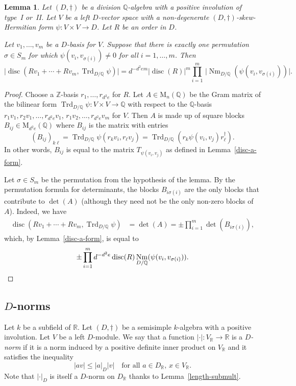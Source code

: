 \documentclass[JEP,XML,SOM,Unicode,NoFloatCountersInSection]{cedram}
\newcommand{\bQ}{\mathbb{Q}}
\newcommand{\bR}{\mathbb{R}}
\newcommand{\bZ}{\mathbb{Z}}
\newcommand{\rM}{\mathrm{M}}
\DeclareMathOperator{\disc}{disc}
\DeclareMathOperator{\Nm}{Nm}
\DeclareMathOperator{\Trd}{Trd}
\newcommand{\abs}[1]{\lvert #1 \rvert}
\newcommand{\defterm}[1]{\emph{#1}}
\newtheorem{lemma}{Lemma}[section]
\begin{document}
\begin{lemma} \label{disc-triangular}
Let $(D, \dag)$ be a division $\bQ$-algebra with a positive involution of type~I or~II.
Let $V$ be a left $D$-vector space with a non-degenerate $(D,\dag)$-skew-Hermitian form $\psi \colon V \times V \to D$.
Let $R$ be an order in $D$.

Let $v_1, \dotsc, v_m$ be a $D$-basis for $V$.
Suppose that there is exactly one permutation $\sigma \in S_m$ for which $\psi(v_i, v_{\sigma(i)}) \neq 0$ for all $i = 1, \dotsc, m$.
Then
\[
\abs{\disc(Rv_1 + \dotsb + Rv_m, \Trd_{D/\bQ} \psi)} = d^{-d^2em} \abs{\disc(R)}^m \prod_{i=1}^m\, \abs{\Nm_{D/\bQ}(\psi(v_i, v_{\sigma(i)}))}.
\]
\end{lemma}

\begin{proof}
Choose a $\bZ$-basis $r_1, \dotsc, r_{d^2e}$ for $R$.
Let $A \in \rM_n(\bQ)$ be the Gram matrix of the bilinear form $\Trd_{D/\bQ} \psi \colon V \times V \to \bQ$ with respect to the $\bQ$-basis $r_1 v_1, r_2 v_1, \dotsc, r_{d^2e} v_1$, $r_1 v_2, \dotsc, r_{d^2e} v_m$ for $V$.
Then $A$ is made up of square blocks $B_{ij} \in \rM_{d^2e}(\bQ)$ where $B_{ij}$ is the matrix with entries
\[
(B_{ij})_{k\ell} = \Trd_{D/\bQ} \psi(r_k v_i, r_\ell v_j) = \Trd_{D/\bQ}(r_k\psi(v_i, v_j)r_\ell^\dag).
\]
In other words, $B_{ij}$ is equal to the matrix $T_{\psi(v_i, v_j)}$ as defined in Lemma~\ref{disc-a-form}.

Let $\sigma \in S_m$ be the permutation from the hypothesis of the lemma.
By the permutation formula for determinants, the blocks $B_{i\sigma(i)}$ are the only blocks that
contribute to $\det(A)$ (although they need not be the only non-zero blocks of~$A$).
Indeed, we have
\begin{align*}
\disc(Rv_1 + \dotsb + Rv_m, \Trd_{D/\bQ} \psi)
& = \det(A)
= \pm \prod_{i=1}^m \det(B_{i\sigma(i)}),
\end{align*}
which, by Lemma~\ref{disc-a-form}, is equal to
\[
\pm \prod_{i=1}^m d^{-d^2e} \disc(R) \Nm_{D/\bQ}(\psi(v_i, v_{\sigma(i)})).
\qedhere
\]
\end{proof}

\subsection{\texorpdfstring{$D$}{D}-norms}

Let $k$ be a subfield of $\bR$.
Let $(D,\dag)$ be a semisimple $k$-algebra with a positive involution.
Let $V$ be a left $D$-module.
We say that a function $\abs{\cdot} \colon V_\bR \to \bR$ is a \defterm{$D$-norm} if it is a norm induced by a positive definite inner product on $V_\bR$ and it satisfies the inequality
\[
\abs{av} \leq \abs{a}_D \abs{v} \quad\text{for all } a \in D_\bR,\, x \in V_\bR.
\]
Note that $\abs{\cdot}_D$ is itself a $D$-norm on $D_\bR$ thanks to Lemma~\ref{length-submult}.
\end{document}

